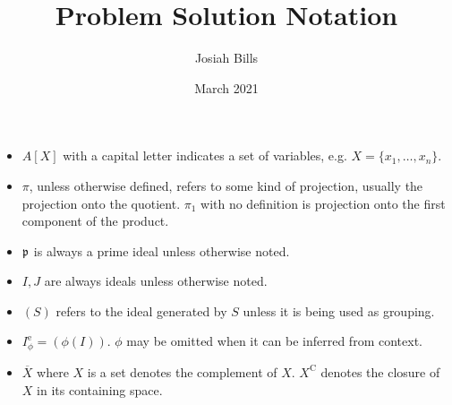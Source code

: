 \documentclass{article}
\title{Problem Solution Notation}
\author{Josiah Bills}
\date{March 2021}
\begin{document}
\maketitle
\begin{itemize}
    \item $A[X]$ with a capital letter indicates a set of variables, e.g.
          $X=\{x_1,\dots, x_n\}$.
    \item $\pi$, unless otherwise defined, refers to some kind of
          projection, usually the projection onto the quotient. $\pi_1$
          with no definition is projection onto the first component of the product.
    \item $\mathfrak{p}$ is always a prime ideal unless otherwise noted.
    \item $I, J$ are always ideals unless otherwise noted.
    \item $(S)$ refers to the ideal generated by $S$
          unless it is being used as grouping.
    \item $I^{\text{e}}_{\phi}=(\phi(I))$. $\phi$ may be omitted when it can be
          inferred from context.
    \item $\overline{X}$ where $X$ is a set denotes the
          complement of $X$. $X^{\text{C}}$ denotes the
          closure of $X$ in its containing space.
\end{itemize}
\end{document}
